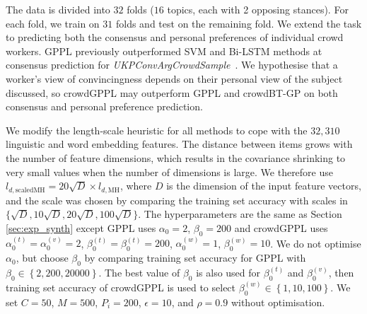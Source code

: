 The data is divided into $32$ folds ($16$ topics, each with 2 opposing stances). For each fold, we train on $31$ folds and test on the remaining fold.
We extend
the task 
to predicting both the consensus and personal preferences of individual crowd workers.
GPPL previously outperformed SVM and Bi-LSTM methods at consensus prediction for \emph{UKPConvArgCrowdSample}~\citep{simpson2018finding}. 
We hypothesise that a worker's view of convincingness 
depends on their personal view of the subject 
discussed, so crowdGPPL may outperform GPPL and
 crowdBT-GP on both consensus and personal preference prediction.


We modify the length-scale heuristic for all methods 
to cope with the $32,310$ linguistic and word embedding features.
The distance between items grows with the number of feature dimensions,
which results in the covariance shrinking to very small values when the number of dimensions
is large. We therefore use
$l_{d,\mathrm{scaledMH}} = 20\sqrt{D} \times l_{d,\mathrm{MH}}$, 
where $D$ is the dimension of the input feature vectors,
and the scale was chosen by comparing the training set accuracy 
with scales in $\{\sqrt{D}, 10\sqrt{D}, 20\sqrt{D}, 100\sqrt{D}\}$.
The hyperparameters are the same as Section \ref{sec:exp_synth} 
except GPPL uses $\alpha_0 = 2$, $\beta_0 = 200$ and
crowdGPPL uses $\alpha^{(t)}_0=\alpha^{(v)}_0=2$, $\beta^{(t)}_0=\beta^{(t)}_0=200$,
$\alpha^{(w)}_0=1$, $\beta^{(w)}_0=10$.
We do not optimise $\alpha_0$, but choose $\beta_0$ by comparing
training set accuracy for GPPL with $\beta_0 \in \left\{2,200,20000\right\}$.
The best value of $\beta_0$ is also used for $\beta^{(t)}_0$ and $\beta^{(v)}_0$, 
then training set accuracy of crowdGPPL is used to select 
$\beta^{(w)}_0 \in \left\{1, 10, 100 \right\}$.
We set $C=50$, $M=500$, $P_i=200$, $\epsilon=10$, and $\rho=0.9$ without optimisation.

